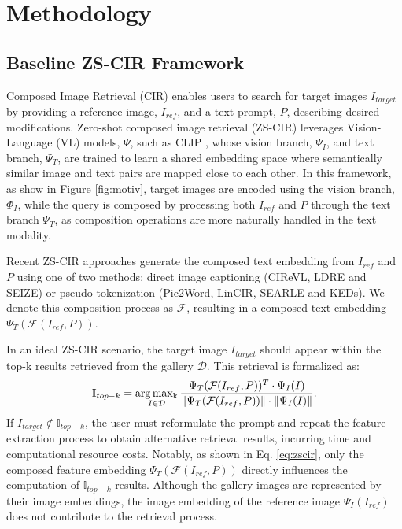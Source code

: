 \section{Methodology}
\label{sec:meth}

\subsection{Baseline ZS-CIR Framework}
Composed Image Retrieval (CIR) enables users to search for target images $I_{target}$ by providing a reference image, $I_{ref}$, and a text prompt, $P$, describing desired modifications. Zero-shot composed image retrieval (ZS-CIR) leverages Vision-Language (VL) models, $\Psi$, such as CLIP \cite{radford2021learning}, whose vision branch, $\Psi_{I}$, and text branch, $\Psi_{T}$, are trained to learn a shared embedding space where semantically similar image and text pairs are mapped close to each other. In this framework, as show in Figure \ref{fig:motiv}, target images are encoded using the vision branch, $\Phi_{I}$, while the query is composed by processing both $I_{ref}$ and $P$ through the text branch $\Psi_{T}$, as composition operations are more naturally handled in the text modality. 

Recent ZS-CIR approaches generate the composed text embedding from $I_{ref}$ and $P$ using one of two methods: direct image captioning (CIReVL, LDRE and SEIZE) or pseudo tokenization (Pic2Word, LinCIR, SEARLE and KEDs). We denote this composition process as $\mathcal{F}$, resulting in a composed text embedding $\Psi_T(\mathcal{F}(I_{ref}, P))$.

In an ideal ZS-CIR scenario, the target image $I_{target}$ should appear within the top-k results retrieved from the gallery $\mathcal{D}$. This retrieval is formalized as:
\begin{equation}
\label{eq:zscir}
\mathbb{I}_{top-k} = \operatorname*{arg\,max_{k}}_{I \in \mathcal{D}} \frac{\Psi_T(\mathcal{F}(I_{ref}, P))^T \cdot \Psi_I(I)}{\lVert\Psi_T(\mathcal{F}(I_{ref}, P))\rVert \cdot \lVert\Psi_I(I)\rVert}.
\end{equation}
If $I_{target} \notin \mathbb{I}_{top-k}$, the user must reformulate the prompt and repeat the feature extraction process to obtain alternative retrieval results, incurring time and computational resource costs. Notably, as shown in Eq. \ref{eq:zscir}, only the composed feature embedding $\Psi_T(\mathcal{F}(I_{ref}, P))$ directly influences the computation of $\mathbb{I}_{top-k}$ results. Although the gallery images are represented by their image embeddings, the image embedding of the reference image $\Psi_I(I_{ref})$ does not contribute to the retrieval process.



